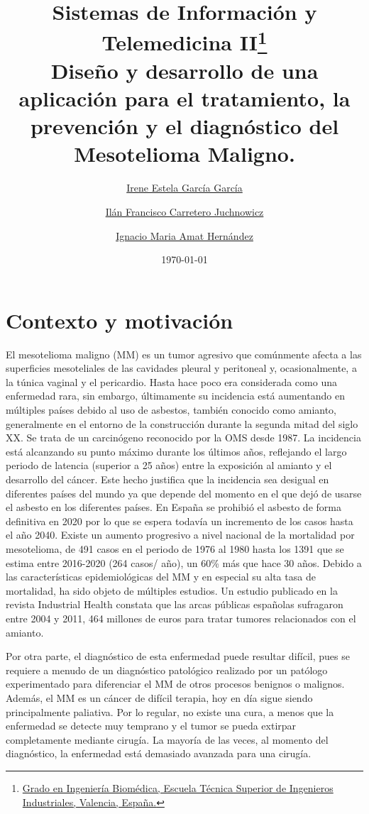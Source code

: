 \documentclass{article}
\title{Sistemas de Información y Telemedicina
II\thanks{\href{https://www.upv.es/titulaciones/GIB/indexc.html}{Grado
en Ingeniería Biomédica, Escuela Técnica Superior de Ingenieros
Industriales, Valencia, España.}} \\\textbf{Diseño y desarrollo de una
aplicación para el tratamiento, la prevención y el diagnóstico del
Mesotelioma Maligno.}}
\author{
\href{mailto:irgarga4@etsii.upv.es}{Irene Estela García García}
\and
\href{mailto:ilcarjuc@etsii.upv.es}{Ilán Francisco Carretero Juchnowicz}
\and
\href{mailto:igamher@etsid.upv.es}{Ignacio Maria Amat Hernández}
}
\date{\today}
\begin{document}
\maketitle
\newpage
\tableofcontents
\listoffigures
\lstlistoflistings
\newpage

\section{Contexto y motivación}


El mesotelioma maligno (MM) es un tumor agresivo que comúnmente afecta
a las superficies mesoteliales de las cavidades pleural  y  peritoneal
y, ocasionalmente, a la túnica vaginal y el  pericardio.   Hasta  hace
poco  era  considerada	como  una  enfermedad	rara,	sin   embargo,
últimamente su incidencia está aumentando en múltiples	países	debido
al uso de asbestos, también conocido como amianto, generalmente en  el
entorno de la construcción durante la segunda mitad del siglo XX.   Se
trata de  un  carcinógeno  reconocido  por  la	OMS  desde  1987.   La
incidencia está alcanzando su punto máximo durante los	últimos  años,
reflejando el largo periodo de latencia (superior a 25 años) entre  la
exposición al amianto y el desarrollo del cáncer. Este hecho justifica
que la incidencia sea desigual en diferentes países del mundo  ya  que
depende del momento en el  que	dejó  de  usarse  el  asbesto  en  los
diferentes  países.   En  España  se  prohibió	el  asbesto  de  forma
definitiva en 2020 por lo que se espera todavía un incremento  de  los
casos hasta el año 2040. Existe un aumento progresivo a nivel nacional
de la mortalidad por mesotelioma, de 491 casos en el periodo  de  1976
al 1980 hasta los 1391 que se estima entre 2016-2020 (264 casos/ año),
un  60\%  más  que  hace  30  años.   Debido  a  las   características
epidemiológicas del MM y en especial su alta tasa  de  mortalidad,  ha
sido objeto de múltiples estudios.  Un estudio publicado en la revista
Industrial Health constata que las arcas públicas españolas sufragaron
entre  2004  y	2011,  464  millones  de  euros  para  tratar  tumores
relacionados con el amianto.

Por otra parte, el  diagnóstico  de  esta  enfermedad  puede  resultar
difícil, pues se  requiere  a  menudo  de  un  diagnóstico  patológico
realizado por un patólogo experimentado  para  diferenciar  el	MM  de
otros procesos benignos o malignos.  Además, el MM  es	un  cáncer  de
difícil terapia, hoy en día sigue siendo principalmente paliativa. Por
lo regular, no existe una cura, a menos que la enfermedad  se  detecte
muy temprano y el  tumor  se  pueda  extirpar  completamente  mediante
cirugía.  La mayoría de las veces,  al	momento  del  diagnóstico,  la
enfermedad    está    demasiado    avanzada    para    una    cirugía.
\end{document}
